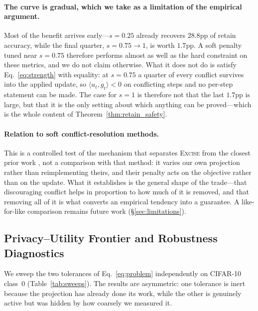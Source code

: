 \documentclass{article}
\newcommand{\ours}{\textsc{Excise}}
\newcommand{\gr}{g_{\mathrm{r}}}
\theoremstyle{remark}
\theoremstyle{plain}
\begin{document}
\paragraph{The curve is gradual, which we take as a limitation of the empirical
argument.} Most of the benefit arrives early---$s=0.25$ already recovers
$28.8$pp of retain accuracy, while the final quarter, $s=0.75\to1$, is worth
$1.7$pp. A soft penalty tuned near $s=0.75$ therefore performs almost as well as
the hard constraint on these metrics, and we do not claim otherwise. What it
does not do is satisfy Eq.~\ref{eq:strength} with equality: at $s=0.75$ a
quarter of every conflict survives into the applied update, so
$\langle u_t,\gr\rangle<0$ on conflicting steps and no per-step statement can be
made. The case for $s=1$ is therefore not that the last $1.7$pp is large, but
that it is the only setting about which anything can be proved---which is the
whole content of Theorem~\ref{thm:retain_safety}.

\paragraph{Relation to soft conflict-resolution methods.}
This is a controlled test of the mechanism that separates \ours{} from the
closest prior work \citep{patel2025learning}, not a comparison with that method:
it varies our own projection rather than reimplementing theirs, and their
penalty acts on the objective rather than on the update. What it establishes is
the general shape of the trade---that discouraging conflict helps in proportion
to how much of it is removed, and that removing all of it is what converts an
empirical tendency into a guarantee. A like-for-like comparison remains future
work (\S\ref{sec:limitations}).

\subsection{Privacy--Utility Frontier and Robustness Diagnostics}\label{sec:sweeps}

We sweep the two tolerances of Eq.~\ref{eq:problem} independently on CIFAR-10
class~0 (Table~\ref{tab:sweeps}). The results are asymmetric: one tolerance is
inert because the projection has already done its work, while the other is
genuinely active but was hidden by how coarsely we measured it.
\end{document}
